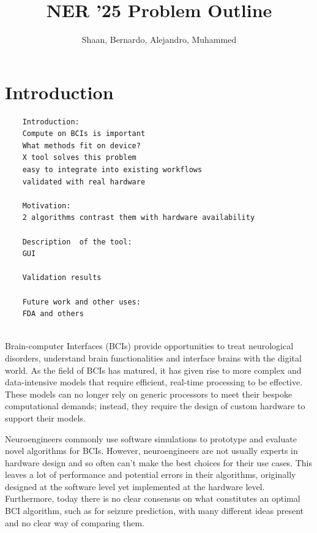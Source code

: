 \documentclass[twocolumn]{article}
\title{NER '25 Problem Outline}
\author{Shaan, Bernardo, Alejandro, Muhammed}
\date{}
\begin{document}
% 

% 

\maketitle

\section{Introduction}

\begin{verbatim}
    Introduction:
    Compute on BCIs is important
    What methods fit on device?
    X tool solves this problem
    easy to integrate into existing workflows
    validated with real hardware

    Motivation:
    2 algorithms contrast them with hardware availability

    Description  of the tool:
    GUI

    Validation results

    Future work and other uses:
    FDA and others
    
\end{verbatim}


Brain-computer Interfaces (BCIs) provide opportunities to treat neurological disorders, understand brain functionalities and interface brains with the digital world. As the field of BCIs has matured, it has given rise to more complex and data-intensive models that require efficient, real-time processing to be effective. These models can no longer rely on generic processors to meet their bespoke computational demands; instead, they require the design of custom hardware to support their models.

Neuroengineers commonly use software simulations to prototype and evaluate novel algorithms for BCIs. However, neuroengineers are not usually experts in hardware design and so often can't make the best choices for their use cases. This leaves a lot of performance and potential errors in their algorithms, originally designed at the software level yet implemented at the hardware level. Furthermore, today there is no clear consensus on what constitutes an optimal BCI algorithm, such as for seizure prediction, with many different ideas present and no clear way of comparing them.
\end{document}
